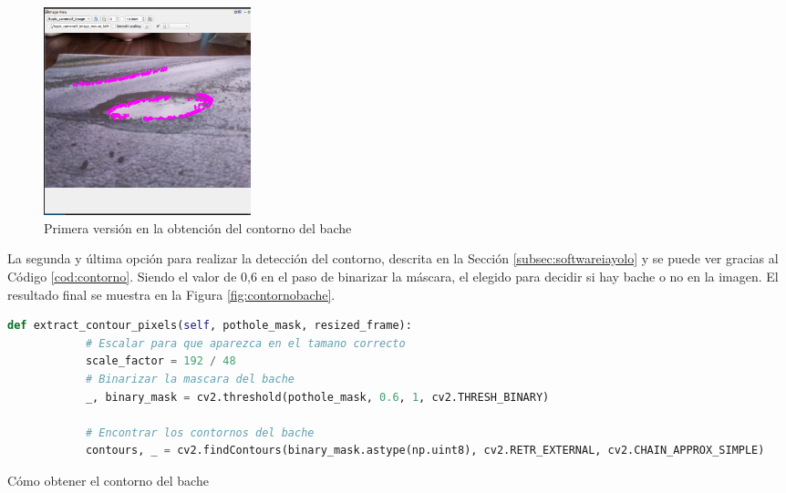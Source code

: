 \begin{figure} [h!]
	\begin{center}
			\includegraphics[width=6cm]{figs/cap7/contornoerror.png}
		\end{center}
	\caption{Primera versión en la obtención del contorno del bache}
	\label{fig:contornoerror}
\end{figure}

La segunda y última opción para realizar la detección del contorno, descrita en la Sección \ref{subsec:softwareiayolo} y se puede ver gracias al Código \ref{cod:contorno}. Siendo el valor de 0,6 en el paso de binarizar la máscara, el elegido para decidir si hay bache o no en la imagen. El resultado final se muestra en la Figura \ref{fig:contornobache}.

\begin{code}[h]
	\begin{lstlisting}[language=Python]
		def extract_contour_pixels(self, pothole_mask, resized_frame):
			# Escalar para que aparezca en el tamano correcto
			scale_factor = 192 / 48
			# Binarizar la mascara del bache
			_, binary_mask = cv2.threshold(pothole_mask, 0.6, 1, cv2.THRESH_BINARY)
		
			# Encontrar los contornos del bache
			contours, _ = cv2.findContours(binary_mask.astype(np.uint8), cv2.RETR_EXTERNAL, cv2.CHAIN_APPROX_SIMPLE)
	\end{lstlisting}
	\caption[Cómo obtener el contorno del bache]{Cómo obtener el contorno del bache}
	\label{cod:contorno}
\end{code}

 


